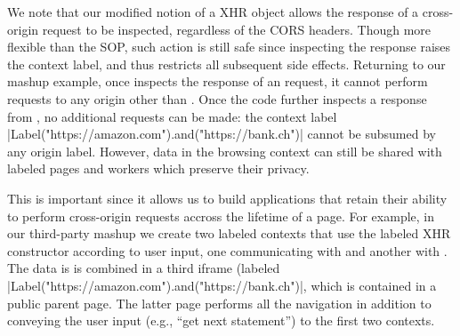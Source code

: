 We note that our modified notion of a XHR object allows the response of a
cross-origin request to be inspected, regardless of the CORS headers.
%
Though more flexible than the SOP, such action is still safe since inspecting
the response raises the context label, and thus restricts all subsequent side
effects.
%
Returning to our mashup example, once  inspects the
response of an  request, it cannot perform requests
to any origin other than .
%
Once the code further inspects a response from , no
additional requests can be made: the context label  
\js|Label("https://amazon.com").and("https://bank.ch")|
cannot be subsumed by any origin label. 
%
However, data in the browsing context can still be shared with labeled
pages and workers which preserve their privacy.
% 

This is important since it allows us to build applications that retain
their ability to perform cross-origin requests accross the lifetime of
a page.
%
For example, in our third-party mashup we create two labeled contexts
that use the labeled XHR constructor according to user input, one
communicating with  and another with
.
%
The data is is combined in a third iframe (labeled
\js|Label("https://amazon.com").and("https://bank.ch")|, which is
contained in a public parent page.
%
The latter page performs all the navigation in addition to conveying
the user input (e.g., ``get next statement'') to the first two
contexts.



